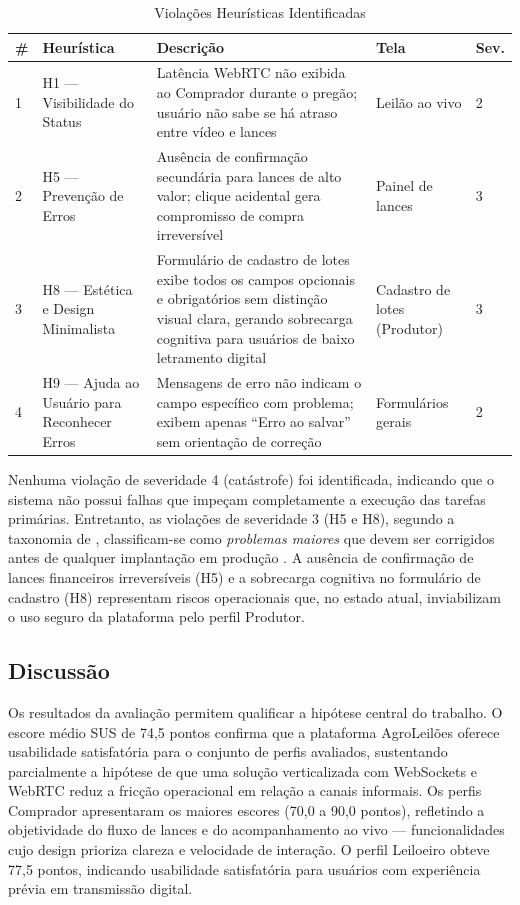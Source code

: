\documentclass[12pt]{article}
\begin{document}
\begin{table}[h]
\centering
\footnotesize
\caption{Violações Heurísticas Identificadas}
\label{tab:heuristica}
\begin{tabular}{p{0.4cm} p{3.0cm} p{6.5cm} p{2.4cm} p{0.6cm}}
\toprule
\textbf{\#} & \textbf{Heurística} & \textbf{Descrição} & \textbf{Tela} & \textbf{Sev.} \\
\midrule
1 & H1 --- Visibilidade do Status &
  Latência WebRTC não exibida ao Comprador durante o pregão; usuário não sabe se há
  atraso entre vídeo e lances &
  Leilão ao vivo & 2 \\[4pt]
2 & H5 --- Prevenção de Erros &
  Ausência de confirmação secundária para lances de alto valor; clique acidental gera
  compromisso de compra irreversível &
  Painel de lances & 3 \\[4pt]
3 & H8 --- Estética e Design Minimalista &
  Formulário de cadastro de lotes exibe todos os campos opcionais e obrigatórios
  sem distinção visual clara, gerando sobrecarga cognitiva para usuários
  de baixo letramento digital &
  Cadastro de lotes (Produtor) & 3 \\[4pt]
4 & H9 --- Ajuda ao Usuário para Reconhecer Erros &
  Mensagens de erro não indicam o campo específico com problema;
  exibem apenas ``Erro ao salvar'' sem orientação de correção &
  Formulários gerais & 2 \\
\bottomrule
\end{tabular}
\end{table}

Nenhuma violação de severidade 4 (catástrofe) foi identificada, indicando que o sistema
não possui falhas que impeçam completamente a execução das tarefas primárias. Entretanto,
as violações de severidade 3 (H5 e H8), segundo a taxonomia de \cite{nielsen1994b},
classificam-se como \textit{problemas maiores} que devem ser corrigidos antes de qualquer
implantação em produção \cite{nielsen1994b}. A ausência de confirmação de lances
financeiros irreversíveis (H5) e a sobrecarga cognitiva no formulário de cadastro (H8)
representam riscos operacionais que, no estado atual, inviabilizam o uso seguro da
plataforma pelo perfil Produtor.

\subsection{Discussão}

Os resultados da avaliação permitem qualificar a hipótese central do trabalho. O escore
médio SUS de 74,5 pontos confirma que a plataforma AgroLeilões oferece usabilidade
satisfatória para o conjunto de perfis avaliados, sustentando parcialmente a hipótese
de que uma solução verticalizada com WebSockets e WebRTC reduz a fricção operacional
em relação a canais informais. Os perfis Comprador apresentaram os maiores escores
(70,0 a 90,0 pontos), refletindo a objetividade do fluxo de lances e do acompanhamento
ao vivo --- funcionalidades cujo design prioriza clareza e velocidade de interação.
O perfil Leiloeiro obteve 77,5 pontos, indicando usabilidade satisfatória para usuários
com experiência prévia em transmissão digital.
\end{document}
